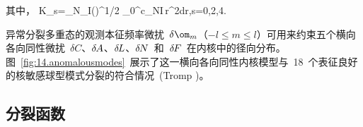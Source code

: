 \fi
其中，
\eq
K_s=\sum_N\sum_I\left(\right)^{1/2}
\int_0^c\Gamma_{N\hspace{-0.3 mm}I}\,r^2dr,\qquad s=0,2,4.
\en

异常分裂多重态的观测本征频率微扰~$\delta\om_m$（$-l\leq m\leq l$）可用来约束五个横向各向同性微扰~$\delta C$、$\delta\hspace{-0.3 mm}A$、$\delta\hspace{-0.3 mm}L$、$\delta\hspace{-0.3 mm}N$~和~$\delta\hspace{-0.3 mm}F$~在内核中的径向分布。图~\ref{fig:14.anomalousmodes}~展示了这一横向各向同性内核模型与~18~个表征良好的核敏感球型模式分裂的符合情况~(Tromp \citeyear{tromp93})。
%
%
%
%

\subsection{分裂函数}
%
%
\label{14.sec.splitfcn}

